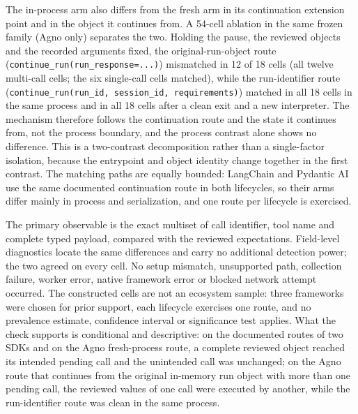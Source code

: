 The in-process arm also differs from the fresh arm in its continuation extension point
and in the object it continues from. A 54-cell ablation in the same frozen family
(Agno only) separates the two. Holding the pause, the reviewed objects and the
recorded arguments fixed, the original-run-object route
(\texttt{continue\_run(run\_response=...)})
mismatched in 12 of 18 cells (all twelve multi-call cells; the six single-call cells matched), while the run-identifier route
(\texttt{continue\_run(run\_id, session\_id, requirements)}) matched in all 18 cells in
the same process and in all 18 cells after a clean exit and a new interpreter. The
mechanism therefore follows the continuation route and the state it continues from, not
the process boundary, and the process contrast alone shows no difference. This is a
two-contrast decomposition rather than a single-factor isolation, because the
entrypoint and object identity change together in the first contrast. The matching
paths are equally bounded: LangChain and Pydantic AI use the same documented
continuation route in both lifecycles, so their arms differ mainly in process and
serialization, and one route per lifecycle is exercised.

The primary observable is the exact multiset of call identifier, tool name and
complete typed payload, compared with the reviewed expectations. Field-level
diagnostics locate the same differences and carry no additional detection power; the
two agreed on every cell. No setup mismatch, unsupported path, collection failure,
worker error, native framework error or blocked network attempt occurred. The
constructed cells are not an ecosystem sample: three frameworks were chosen for prior
support, each lifecycle exercises one route, and no prevalence estimate, confidence
interval or significance test applies. What the check supports is conditional and
descriptive: on the documented routes of two SDKs and on the Agno fresh-process route,
a complete reviewed object reached its intended pending call and the unintended call
was unchanged; on the Agno route that continues from the original in-memory run object
with more than one pending call, the reviewed values of one call were executed by
another, while the run-identifier route was clean in the same process.

